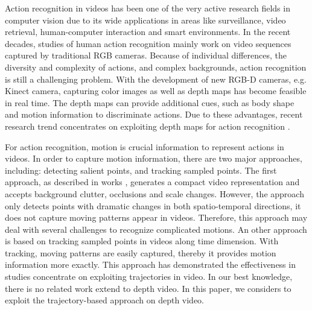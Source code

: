 \documentclass[review]{elsarticle}
\begin{document}
Action recognition in videos has been one of the very active research fields in computer vision \cite{pirsiavash2012detecting, poppe2010survey} due to its wide applications in areas like surveillance, video retrieval, human-computer interaction and smart environments. In the recent decades, studies of human action recognition mainly work on video sequences captured by traditional RGB cameras. Because of individual differences, the diversity and complexity of actions, and complex backgrounds, action recognition is still a challenging problem. With the development of new RGB-D cameras, e.g. Kinect camera, capturing color images as well as depth maps has become feasible in real time. The depth maps can provide additional cues, such as body shape and motion information to discriminate actions. Due to these advantages, recent research trend concentrates on exploiting depth maps for action recognition \cite{li2010action, wang2012mining, yang2012eigenjoints, yang2012recognizing, xia2011human, xia2012view, xia2013spatio, oreifej2013hon4d, vieira2012stop, wang2012robust}.

For action recognition, motion is crucial information to represent actions in videos.
In order to capture motion information, there are two major approaches, including: detecting salient points, and tracking sampled points.
The first approach, as described in works \cite{laptev2005space, dollar2005behavior, laptev2008learning, bregonzio2009recognising, klaser2008aspatiotemporal, willems2008efficient}, generates a compact video representation and accepts background clutter, occlusions and scale changes.
However, the approach only detects points with dramatic changes in both spatio-temporal directions, it does not capture moving patterns appear in videos.
Therefore, this approach may deal with several challenges to recognize complicated motions.
An other approach is based on tracking sampled points in videos along time dimension.
With tracking, moving patterns are easily captured, thereby it provides motion information more exactly.
This approach has demonstrated the effectiveness in studies \cite{matikainen2009trajectons, messing2009activity, sun2009hierarchical} concentrate on exploiting trajectories in video.
In our best knowledge, there is no related work extend to depth video.
In this paper, we considers to exploit the trajectory-based approach on depth video.
\end{document}
